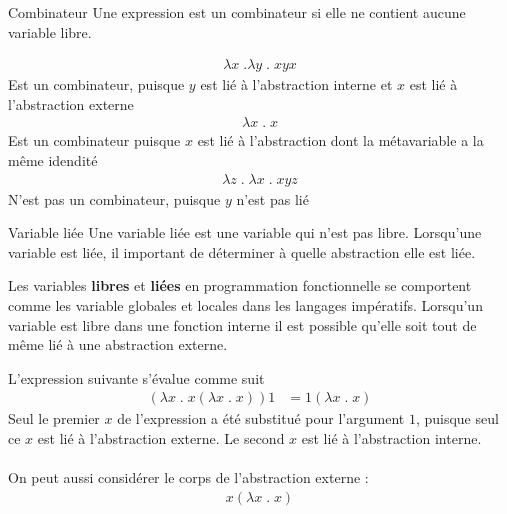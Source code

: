 \documentclass{report}
\begin{document}
\begin{multicols*}{3}
    \begin{Definitionx}{Combinateur}{}
        Une expression est un combinateur si elle ne contient aucune 
        variable libre.  
    \end{Definitionx}

    \begin{EExample}{}{}
        \begin{align*}
          \lambda x \; . \lambda y \; . \; x y x 
        \end{align*}
        Est un combinateur, puisque $y$ est lié à l'abstraction interne 
        et $x$ est lié à l'abstraction externe
        \begin{align*}
          \lambda x \; . \; x 
        \end{align*}
        Est un combinateur puisque $x$ est lié à l'abstraction dont 
        la métavariable a la même idendité
        \begin{align*}
          \lambda z \; . \; \lambda x \; . \; x y z
        \end{align*}
        N'est pas un combinateur, puisque $y$ n'est pas lié
    \end{EExample}


    \begin{Definitionx}{Variable liée}{}
        Une variable liée est une variable qui n'est pas libre. Lorsqu'une 
        variable est liée, il important de déterminer à quelle abstraction 
        elle est liée.
    \end{Definitionx}


    \begin{note}{}{}
        Les variables \textbf{libres} et \textbf{liées} en programmation 
        fonctionnelle se comportent 
        comme les variable globales et locales dans les langages 
        impératifs. Lorsqu'un variable est libre dans une fonction interne 
        il est possible qu'elle soit tout de même lié à une abstraction 
        externe. 
    \end{note}

    \begin{EExample}{}{}
        L'expression suivante s'évalue comme suit
        \begin{align*}
          (\lambda x \; . \; x (\lambda x \; . \; x)) 1
          &= 1 (\lambda x \; . \; x)
        \end{align*}
        Seul le premier $x$ de l'expression a été substitué pour 
        l'argument $1$, puisque seul ce $x$ est lié à l'abstraction externe. 
        Le second $x$ est lié à l'abstraction interne. 
        \\\\ 
        On peut aussi considérer le corps de l'abstraction externe :
        \begin{align*}
            x (\lambda x \; . \; x)
        \end{align*}


\end{EExample}
\end{multicols*}
\end{document}
